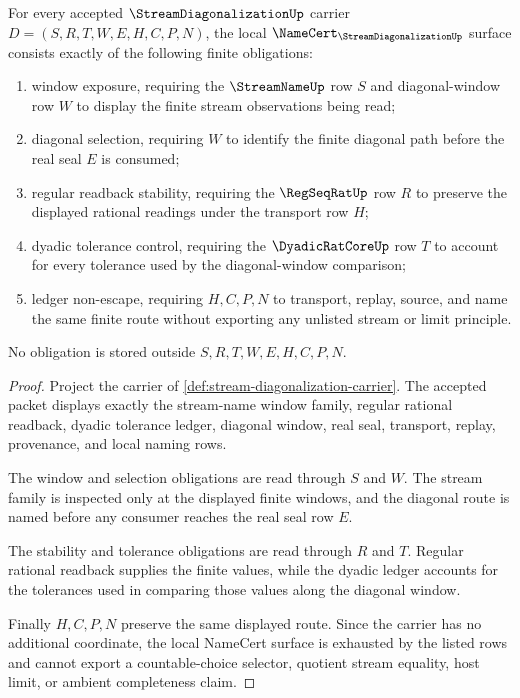 \begin{theorem}
\label{thm:stream-diagonalization-namecert-obligations}
For every accepted $\StreamDiagonalizationUp$ carrier $D=(S,R,T,W,E,H,C,P,N)$, the local $\NameCert_{\StreamDiagonalizationUp}$ surface consists exactly of the following finite obligations:
\begin{enumerate}
\item window exposure, requiring the $\StreamNameUp$ row $S$ and diagonal-window row $W$ to display the finite stream observations being read;
\item diagonal selection, requiring $W$ to identify the finite diagonal path before the real seal $E$ is consumed;
\item regular readback stability, requiring the $\RegSeqRatUp$ row $R$ to preserve the displayed rational readings under the transport row $H$;
\item dyadic tolerance control, requiring the $\DyadicRatCoreUp$ row $T$ to account for every tolerance used by the diagonal-window comparison;
\item ledger non-escape, requiring $H,C,P,N$ to transport, replay, source, and name the same finite route without exporting any unlisted stream or limit principle.
\end{enumerate}
No obligation is stored outside $S,R,T,W,E,H,C,P,N$.
\end{theorem}
\begin{proof}
Project the carrier of \autoref{def:stream-diagonalization-carrier}. The accepted packet displays exactly the stream-name window family, regular rational readback, dyadic tolerance ledger, diagonal window, real seal, transport, replay, provenance, and local naming rows.

The window and selection obligations are read through $S$ and $W$. The stream family is inspected only at the displayed finite windows, and the diagonal route is named before any consumer reaches the real seal row $E$.

The stability and tolerance obligations are read through $R$ and $T$. Regular rational readback supplies the finite values, while the dyadic ledger accounts for the tolerances used in comparing those values along the diagonal window.

Finally $H,C,P,N$ preserve the same displayed route. Since the carrier has no additional coordinate, the local NameCert surface is exhausted by the listed rows and cannot export a countable-choice selector, quotient stream equality, host limit, or ambient completeness claim.
\end{proof}

